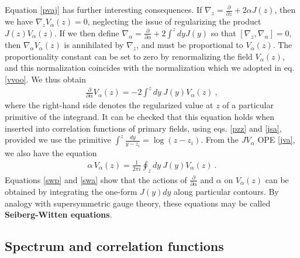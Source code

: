 \documentclass[12pt, a4paper, notitlepage, twoside]{report}
\numberwithin{equation}{section}
\theoremstyle{break}
\begin{document}
Equation \eqref{pvaj} has further interesting consequences.
If $\nabla_z={\frac{\partial}{\partial z}} +2\alpha J(z)$, then we have $\nabla_z V_\alpha(z)=0$, neglecting the issue of regularizing the product $J(z)V_\alpha(z)$.
If we then define $\nabla_\alpha = {\frac{\partial}{\partial \alpha}}+2\int^z dyJ(y)$ so that $[\nabla_z,\nabla_\alpha]=0$, then $\nabla_\alpha V_\alpha(z)$ is annihilated by $\nabla_z$, and must be proportional to $V_\alpha(z)$.
The proportionality constant can be set to zero by renormalizing the field $V_\alpha(z)$, and this normalization coincides with the normalization which we adopted in eq. \eqref{vvoo}.
We thus obtain
\begin{align}
 {\frac{\partial}{\partial \alpha}} V_\alpha(z) = -2 \int^z dy\ J(y)V_\alpha(z)\ ,
\label{swp}
\end{align}
where the right-hand side denotes the regularized value at $z$ of a particular primitive of the integrand.
It can be checked that this equation holds when inserted into correlation functions of primary fields, using eqs. \eqref{pzz} and \eqref{jsa}, provided we use the primitive $\int^z \frac{dy}{y-z_i} = \log(z-z_i)$.
From the $JV_\alpha$ OPE \eqref{jva}, we also have the equation
\begin{align}
 \alpha\, V_\alpha(z) = \frac{1}{2\pi i} \oint_{z} dy\ J(y)V_\alpha(z)\ .
\label{swa}
\end{align}
Equations \eqref{swp} and \eqref{swa} show that the actions of ${\frac{\partial}{\partial \alpha}}$ and $\alpha$ on $V_\alpha(z)$ can be obtained by integrating the one-form $J(y)dy$ along particular contours.
By analogy with supersymmetric gauge theory, these equations may be called \textbf{\boldmath Seiberg-Witten equations}. 


\subsection{Spectrum and correlation functions \label{secsacf}}
\end{document}

